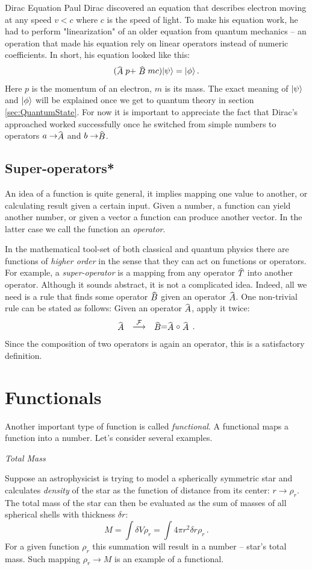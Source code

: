 \begin{mybio}{Dirac Equation}
	Paul Dirac discovered an equation that describes electron moving at any speed $v < c$ where $c$ is the speed of light. To make his equation work, he had to perform "linearization" of an older equation from quantum mechanics -- an operation that made his equation rely on linear operators instead of numeric coefficients. In short, his equation looked like this:
	\[
		(\op{A}p + \op{B}mc)\ket{\psi}=\ket{\phi}\,.
	\]
	Here $p$ is the momentum of an electron, $m$ is its mass. The exact meaning of $|{\psi}\rangle$ and $|{\phi}\rangle$ will be explained once we get to quantum theory in section \ref{sec:QuantumState}. For now it is important to appreciate the fact that Dirac's approached worked successfully once he switched from simple numbers to operators $a\to\op{A}$ and $b\to\op{B}$.
\end{mybio}

\subsection{Super-operators*}
An idea of a function is quite general, it implies mapping one value to another, or calculating result given a certain input. Given a number, a function can yield another number, or given a vector a function can produce another vector. In the latter case we call the function an \emph{operator}.  

In the mathematical tool-set of both classical and quantum physics there are functions of \emph{higher order} in the sense that they can act on functions or operators. For example,  a \emph{super-operator} is a mapping from any operator $\op{T}$ into another operator. Although it sounds abstract, it is not a complicated idea. Indeed, all we need is a rule that finds some operator $\op{B}$ given an operator $\op{A}$. One non-trivial rule can be stated as follows: Given an operator $\op{A}$, apply it twice:
\[
\op{A}\quad\overset{\mathcal{F}}{\longrightarrow}\quad\op{B}=\op{A}\circ\op{A}\,.
\]
Since the composition of two operators is again an operator, this is a satisfactory definition.


\section{Functionals}\label{sec:Functional}
Another important type of function is called \emph{functional}. A functional maps a function into a number. Let's consider several examples.

\begin{flushleft}
	{\it Total Mass}
\end{flushleft}
Suppose an astrophysicist is trying to model a spherically symmetric star and calculates \emph{density} of the star as the function of distance from its center: $r\rightarrow\rho_r$. The total mass of the star can then be evaluated as the sum of masses of all spherical shells with thickness $\delta r$:
\[
M = \int \delta V\rho_r=\int 4\pi r^2\delta r\rho_r\,.
\]
For a given function $\rho_r$ this summation will result in a number -- star's total mass. Such mapping $\rho_r\rightarrow M$ is an example of a functional.

